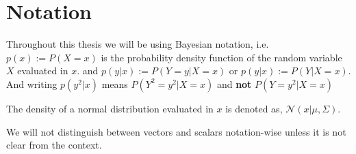 

\section{Notation}
Throughout this thesis we will be using Bayesian notation, i.e. $p(x) := P(X=x)$ is the probability
density function of the random variable $X$ evaluated in $x$. and $p(y|x) := P(Y=y|X=x)$ or $p(y|x)
:= P(Y|X=x)$. And writing $p(y^2|x)$ means $P(Y^2=y^2|X=x)$ and \textbf{not} $P(Y=y^2|X=x)$

The density of a normal distribution evaluated in $x$ is denoted as, $\mathcal{N}(x|\mu, \Sigma)$. 

We will not distinguish between vectors and scalars notation-wise unless it is not clear from the 
context. 

